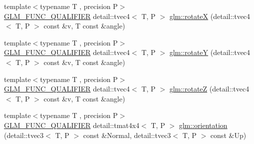 \begin{DoxyCompactItemize}
\item 
{\footnotesize template$<$typename T , precision P$>$ }\\\hyperlink{setup_8hpp_a33fdea6f91c5f834105f7415e2a64407}{G\+L\+M\+\_\+\+F\+U\+N\+C\+\_\+\+Q\+U\+A\+L\+I\+F\+I\+ER} detail\+::tvec4$<$ T, P $>$ \hyperlink{group__gtx__rotate__vector_gaa0db2d8b73f86d7bfdf2bface4056e88}{glm\+::rotateX} (detail\+::tvec4$<$ T, P $>$ const \&v, T const \&angle)
\item 
{\footnotesize template$<$typename T , precision P$>$ }\\\hyperlink{setup_8hpp_a33fdea6f91c5f834105f7415e2a64407}{G\+L\+M\+\_\+\+F\+U\+N\+C\+\_\+\+Q\+U\+A\+L\+I\+F\+I\+ER} detail\+::tvec4$<$ T, P $>$ \hyperlink{group__gtx__rotate__vector_gae48a26ac0e3670ad2486858bf2a8e90b}{glm\+::rotateY} (detail\+::tvec4$<$ T, P $>$ const \&v, T const \&angle)
\item 
{\footnotesize template$<$typename T , precision P$>$ }\\\hyperlink{setup_8hpp_a33fdea6f91c5f834105f7415e2a64407}{G\+L\+M\+\_\+\+F\+U\+N\+C\+\_\+\+Q\+U\+A\+L\+I\+F\+I\+ER} detail\+::tvec4$<$ T, P $>$ \hyperlink{group__gtx__rotate__vector_ga1db5137be16ed5d375038e06707ac52b}{glm\+::rotateZ} (detail\+::tvec4$<$ T, P $>$ const \&v, T const \&angle)
\item 
{\footnotesize template$<$typename T , precision P$>$ }\\\hyperlink{setup_8hpp_a33fdea6f91c5f834105f7415e2a64407}{G\+L\+M\+\_\+\+F\+U\+N\+C\+\_\+\+Q\+U\+A\+L\+I\+F\+I\+ER} detail\+::tmat4x4$<$ T, P $>$ \hyperlink{group__gtx__rotate__vector_gac80aaf3b2af70c7f03f1077d4b6ac507}{glm\+::orientation} (detail\+::tvec3$<$ T, P $>$ const \&Normal, detail\+::tvec3$<$ T, P $>$ const \&Up)
\end{DoxyCompactItemize}
